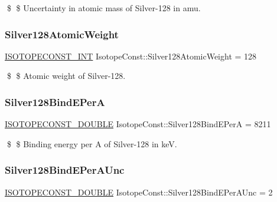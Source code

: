 \$ \$ Uncertainty in atomic mass of Silver-\/128 in amu. \mbox{\label{group___isotope_const-_silver-_ag128_ga24dfee684454b9b98f22607d2e6105f7}} 
\subsubsection{\texorpdfstring{Silver128\+Atomic\+Weight}{Silver128AtomicWeight}}
{\footnotesize\ttfamily \mbox{\hyperlink{group___isotope_const-_macros_ga5f18360b3e99483a35c32d789e62621c}{I\+S\+O\+T\+O\+P\+E\+C\+O\+N\+S\+T\+\_\+\+I\+NT}} Isotope\+Const\+::\+Silver128\+Atomic\+Weight = 128}

\$ \$ Atomic weight of Silver-\/128. \mbox{\label{group___isotope_const-_silver-_ag128_ga8a7ff0db43d05abd752b0d7850473d32}} 
\subsubsection{\texorpdfstring{Silver128\+Bind\+E\+PerA}{Silver128BindEPerA}}
{\footnotesize\ttfamily \mbox{\hyperlink{group___isotope_const-_macros_ga8f45a7272ce02c0b4c65c44636ed719a}{I\+S\+O\+T\+O\+P\+E\+C\+O\+N\+S\+T\+\_\+\+D\+O\+U\+B\+LE}} Isotope\+Const\+::\+Silver128\+Bind\+E\+PerA = 8211}

\$ \$ Binding energy per A of Silver-\/128 in keV. \mbox{\label{group___isotope_const-_silver-_ag128_gaae70e58e676bcf218901722847f5408b}} 
\subsubsection{\texorpdfstring{Silver128\+Bind\+E\+Per\+A\+Unc}{Silver128BindEPerAUnc}}
{\footnotesize\ttfamily \mbox{\hyperlink{group___isotope_const-_macros_ga8f45a7272ce02c0b4c65c44636ed719a}{I\+S\+O\+T\+O\+P\+E\+C\+O\+N\+S\+T\+\_\+\+D\+O\+U\+B\+LE}} Isotope\+Const\+::\+Silver128\+Bind\+E\+Per\+A\+Unc = 2}

